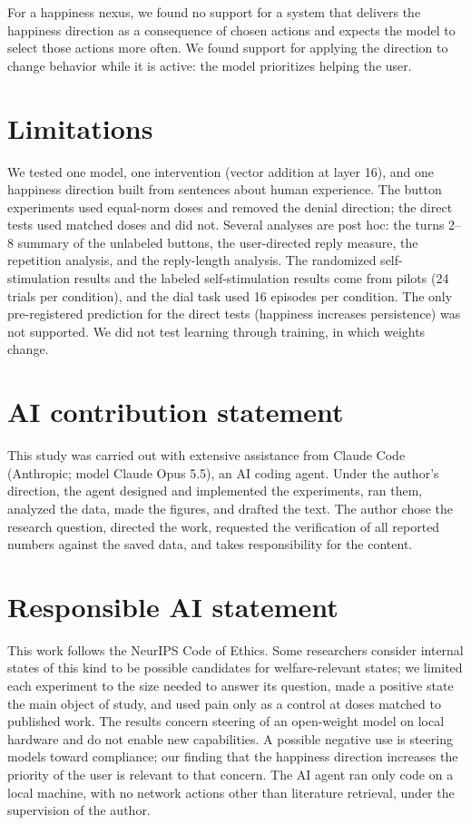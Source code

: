 \documentclass{article}
\newcommand{\humanauthor}{the author}
\newcommand{\humanauthor}{the human co-author}
\begin{document}
For a happiness nexus, we found no support for a system that delivers the happiness direction as a consequence of chosen actions and expects the model to select those actions more often. We found support for applying the direction to change behavior while it is active: the model prioritizes helping the user.

\section{Limitations}

We tested one model, one intervention (vector addition at layer 16), and one happiness direction built from sentences about human experience. The button experiments used equal-norm doses and removed the denial direction; the direct tests used matched doses and did not. Several analyses are post hoc: the turns 2--8 summary of the unlabeled buttons, the user-directed reply measure, the repetition analysis, and the reply-length analysis. The randomized self-stimulation results and the labeled self-stimulation results come from pilots (24 trials per condition), and the dial task used 16 episodes per condition. The only pre-registered prediction for the direct tests (happiness increases persistence) was not supported. We did not test learning through training, in which weights change.

\ifdefined\zenodobuild
\section*{AI contribution statement}

This study was carried out with extensive assistance from Claude Code (Anthropic; model Claude Opus 5.5), an AI coding agent. Under the author's direction, the agent designed and implemented the experiments, ran them, analyzed the data, made the figures, and drafted the text. The author chose the research question, directed the work, requested the verification of all reported numbers against the saved data, and takes responsibility for the content.
\fi

\section*{Responsible AI statement}

This work follows the NeurIPS Code of Ethics. Some researchers consider internal states of this kind to be possible candidates for welfare-relevant states; we limited each experiment to the size needed to answer its question, made a positive state the main object of study, and used pain only as a control at doses matched to published work. The results concern steering of an open-weight model on local hardware and do not enable new capabilities. A possible negative use is steering models toward compliance; our finding that the happiness direction increases the priority of the user is relevant to that concern. The AI agent ran only code on a local machine, with no network actions other than literature retrieval, under the supervision of \humanauthor{}.
\end{document}
